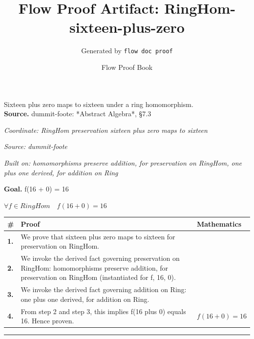 \documentclass[11pt]{article}
\title{Flow Proof Artifact: RingHom-sixteen-plus-zero}
\author{Generated by \texttt{flow doc proof}}
\date{Flow Proof Book}
\theoremstyle{definition}
\begin{document}
\maketitle
Sixteen plus zero maps to sixteen under a ring homomorphism.\\[0.5em]
\textbf{Source.} dummit-foote: *Abstract Algebra*, §7.3\\[0.5em]
\bigskip
{}\par
\smallskip\noindent\textit{Coordinate: RingHom \cdot preservation \cdot sixteen plus zero maps to sixteen}\par
\smallskip\noindent\textit{Source: dummit-foote}\par
\smallskip\noindent\textit{Built on: homomorphisms preserve addition, for preservation on RingHom, one plus one derived, for addition on Ring}\par
\medskip
\noindent\textbf{Goal.} f(16 + 0) = 16\par
\noindent$\displaystyle \forall f \in RingHom\quad f(16 + 0) = 16$\par
\medskip
\noindent
\begin{tabular}{@{} >{\raggedright\arraybackslash}p{} >{\raggedright\arraybackslash}p{} >{\raggedleft\arraybackslash}p{} @{}}
\textbf{\#} & \textbf{Proof} & \textbf{Mathematics} \\
\midrule
\textbf{1.} & We prove that sixteen plus zero maps to sixteen for preservation on RingHom. & \\[0.45em]
\textbf{2.} & We invoke the derived fact governing preservation on RingHom: homomorphisms preserve addition, for preservation on RingHom (instantiated for f, 16, 0). & \\[0.45em]
\textbf{3.} & We invoke the derived fact governing addition on Ring: one plus one derived, for addition on Ring. & \\[0.45em]
\textbf{4.} & From step 2 and step 3, this implies f(16 plus 0) equals 16. Hence proven. & $\displaystyle f(16 + 0) = 16$ \\[0.45em]
\bottomrule
\end{tabular}
\label{thm:RingHom-preservation-sixteen_plus_zero_maps_to_sixteen}
\par\medskip\hrule
\end{document}
